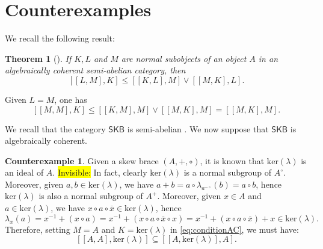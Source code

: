 \documentclass{amsart}
\newtheorem{theorem}{Theorem}[section]
\theoremstyle{definition}
\newcommand{\SKB}{\mathsf{SKB}}
\newenvironment{invisible}{{\noindent\sc \colorbox{yellow}{Invisible:}\;}\color{gray}}{\medskip}
\begin{document}
\section{Counterexamples}

We recall the following result:

\begin{theorem}[{\cite[Theorem 7.1]{CGvdL}}]\label{thm:algcoh}
If $K,L$ and $M$ are normal subobjects of an object $A$ in an algebraically coherent semi-abelian category, then
\[
[[L,M],K]\leq[[K,L],M]\vee[[M,K],L].
\]
\end{theorem}

Given $L=M$, one has
\begin{equation}\label{eq:conditionAC}
[[M,M],K]\leq[[K,M],M]\vee[[M,K],M]=%
[[M,K],M].
\end{equation}

We recall that the category $\SKB$ is semi-abelian \cite{BFP2023}. We now suppose that $\mathsf{SKB}$ is algebraically coherent. \medskip

\noindent\textbf{Counterexample 1}. Given a skew brace $(A,+,\circ)$, it is known that $\mathrm{ker}(\lambda)$ is an ideal of $A$. 
\begin{invisible}
In fact, clearly $\mathrm{ker}(\lambda)$ is a normal subgroup of $A^{\circ}$. Moreover, given $a,b\in\mathrm{ker}(\lambda)$, we have $a+ b=a\circ\lambda_{a^{-\circ}}(b)=a\circ b$, hence $\mathrm{ker}(\lambda)$ is also a normal subgroup of $A^{+}$. Moreover, given $x\in A$ and $a\in\mathrm{ker}(\lambda)$, we have $x\circ a\circ\overline{x}\in\mathrm{ker}(\lambda)$, hence
\[
\lambda_x(a)=x^{-1}+(x\circ a)=x^{-1}+(x\circ a\circ\overline{x}\circ x)=x^{-1}+(x\circ a\circ\overline{x})+ x\in\mathrm{ker}(\lambda).
\]
\end{invisible}
Therefore, setting $M=A$ and $K=\mathrm{ker}(\lambda)$ in \eqref{eq:conditionAC}, we must have:
\begin{equation}\label{eq:ACSKB}
[[A,A],\mathrm{ker}(\lambda)]\subseteq[[A,\mathrm{ker}(\lambda)],A].
\end{equation}
\end{document}
